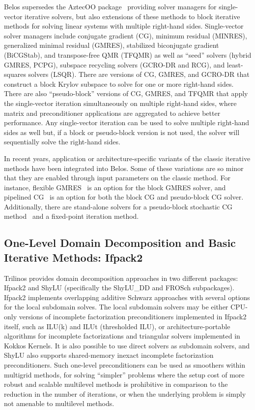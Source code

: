 Belos supersedes the AztecOO package~\cite{Heroux2004a} providing solver managers for single-vector iterative solvers, but also extensions of these methods to block iterative methods for solving linear systems with multiple right-hand sides.  Single-vector solver managers include conjugate gradient (CG), minimum residual (MINRES), generalized minimal residual (GMRES), stabilized biconjugate gradient (BiCGStab), and transpose-free QMR (TFQMR) as well as ``seed'' solvers (hybrid GMRES, PCPG), subspace recycling solvers (GCRO-DR and RCG), and least-squares solvers (LSQR).  There are versions of CG, GMRES, and GCRO-DR that construct a block Krylov subspace to solve for one or more right-hand sides.  There are also ``pseudo-block'' versions of CG, GMRES, and TFQMR that apply the single-vector iteration simultaneously on multiple right-hand sides, where matrix and preconditioner applications are aggregated to achieve better performance. Any single-vector iteration can be used to solve multiple right-hand sides as well but, if a block or pseudo-block version is not used, the solver will sequentially solve the right-hand sides.

In recent years, application or architecture-specific variants of the classic iterative methods have been integrated into Belos. Some of these variations are so minor that they are enabled through input parameters on the classic method. For instance, flexible GMRES~\cite{Saad1993a} is an option for the block GMRES solver, and pipelined CG~\cite{GHYSELS2014224} is an option for both the block CG and pseudo-block CG solver.  Additionally, there are stand-alone solvers for a pseudo-block stochastic CG method~\cite{Parker2012SamplingGD} and a fixed-point iteration method.


\subsection{One-Level Domain Decomposition and Basic Iterative Methods: Ifpack2}

Trilinos provides domain decomposition approaches in two different
packages: Ifpack2 and ShyLU (specifically the ShyLU\_DD and FROSch
subpackages). Ifpack2 implements overlapping additive Schwarz
approaches with several options for the local subdomain solves. The
local subdomain solvers may be either CPU-only versions of incomplete
factorization preconditioners implemented in Ifpack2 itself, such as
ILU(k) and ILUt (thresholded ILU), or architecture-portable algorithms
for incomplete factorizations and triangular solvers implemented in
Kokkos Kernels. It is also possible to use direct solvers as subdomain
solvers, and ShyLU also supports shared-memory inexact
incomplete factorization preconditioners.
%
Such one-level preconditioners can be used as smoothers within multigrid
methods, for solving ``simpler'' problems where the setup cost of more robust and scalable multilevel methods is prohibitive in comparison to the reduction in the number of iterations, or when the underlying problem is simply not amenable to multilevel methods.

